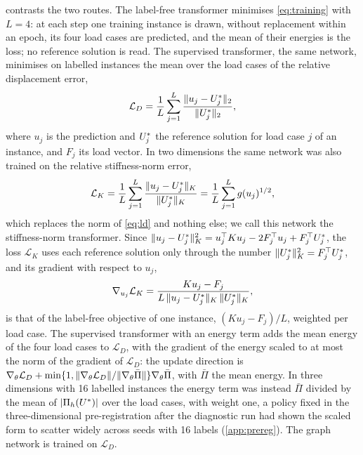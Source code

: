  contrasts the two routes. The label-free transformer minimises
\eqref{eq:training} with $L=4$: at each step one training instance is drawn, without
replacement within an epoch, its four load cases are predicted, and the mean of their
energies is the loss; no reference solution is read. The supervised transformer, the same
network, minimises on labelled instances the mean over the load cases of the relative
displacement error,
\begin{equation}
\mathcal{L}_D=\frac{1}{L}\sum_{j=1}^{L}\frac{\lVert u_j-U^{\ast}_j\rVert_2}{\lVert U^{\ast}_j\rVert_2},
\label{eq:ld}
\end{equation}
where $u_j$ is the prediction and $U^{\ast}_j$ the reference solution for load case $j$ of an
instance, and $F_j$ its load vector. In two dimensions the same network was also trained on
the relative stiffness-norm error,
\begin{equation}
\mathcal{L}_K=\frac{1}{L}\sum_{j=1}^{L}\frac{\lVert u_j-U^{\ast}_j\rVert_K}{\lVert U^{\ast}_j\rVert_K}
=\frac{1}{L}\sum_{j=1}^{L}g(u_j)^{1/2},
\label{eq:lk}
\end{equation}
which replaces the norm of \eqref{eq:ld} and nothing else; we call this network the
stiffness-norm transformer. Since
$\lVert u_j-U^{\ast}_j\rVert_K^2=u_j^{\top}Ku_j-2F_j^{\top}u_j+F_j^{\top}U^{\ast}_j$, the loss
$\mathcal{L}_K$ uses each reference solution only through the number
$\lVert U^{\ast}_j\rVert_K^2=F_j^{\top}U^{\ast}_j$, and its gradient with respect to $u_j$,
\begin{equation}
\nabla_{u_j}\mathcal{L}_K=\frac{Ku_j-F_j}{L\,\lVert u_j-U^{\ast}_j\rVert_K\,\lVert U^{\ast}_j\rVert_K},
\label{eq:lkgrad}
\end{equation}
is that of the label-free objective of one instance, $(Ku_j-F_j)/L$, weighted per load case.
The supervised transformer with an energy term adds the mean energy of the four load cases
to $\mathcal{L}_D$, with the gradient of the energy scaled to at most the norm of the
gradient of $\mathcal{L}_D$: the update direction is
$\nabla_\theta\mathcal{L}_D+\min\{1,\lVert \nabla_\theta\mathcal{L}_D\rVert/\lVert \nabla_\theta\bar\Pi\rVert\}\nabla_\theta\bar\Pi$,
with $\bar\Pi$ the mean energy. In three dimensions with 16 labelled instances the energy
term was instead $\bar\Pi$ divided by the mean of $\lvert\Pi_h(U^{\ast})\rvert$ over the load
cases, with weight one, a policy fixed in the three-dimensional pre-registration after the
diagnostic run had shown the scaled form to scatter widely across seeds with 16 labels
(\ref{app:prereg}). The graph network is trained on $\mathcal{L}_D$.

